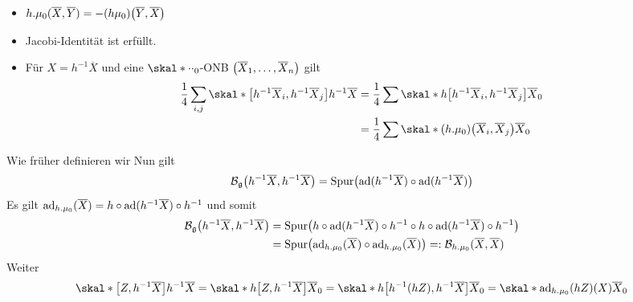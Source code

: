 \begin{itemize}
	\item $h . \mu_0 (\overline{X},\overline{Y}) = - (h \mu_0) \enbrace*{\overline{Y},\overline{X}}$
	\item Jacobi-Identität ist erfüllt.
	\item Für $X = h^{-1} \overline{X}$ und eine $\skal*{\cdot }{\cdot }_0$-ONB $\enbrace*{\overline{X}_1,\ldots ,\overline{X}_n}$ gilt 
	\begin{align}
		\frac{1}{4} \sum_{i,j} \skal*{\benbrace*{h^{-1} \overline{X}_i, h^{-1} \overline{X}_j}}{h^{-1} \overline{X}} &= \frac{1}{4} \sum \skal*{h \benbrace*{h^{-1} \overline{X}_i, h^{-1} \overline{X}_j}}{\overline{X}}_0 \\
		&= \frac{1}{4}\sum \skal*{(h.\mu_0) \enbrace*{\overline{X}_i, \overline{X}_j}}{\overline{X}}_0
	\end{align}
\end{itemize}
Wie früher definieren wir
Nun gilt
\[
	\mathcal{B}_\mathfrak{g} \enbrace*{h^{-1} \overline{X}, h^{-1} \overline{X}} = \Spur \enbrace*{\ad(h^{-1} \overline{X}) \circ \ad(h^{-1} \overline{X})}
\]
Es gilt $\ad_{h.\mu_0}(\overline{X}) = h \circ \ad(h^{-1} \overline{X}) \circ h^{-1}$ und somit
\begin{align}
	\mathcal{B}_\mathfrak{g} \enbrace*{h^{-1} \overline{X}, h^{-1} \overline{X}} &= \Spur \enbrace*{h \circ  \ad(h^{-1}\overline{X}) \circ h^{-1} \circ h \circ \ad(h^{-1} \overline{X}) \circ h^{-1}} \\
	&= \Spur \enbrace*{\ad_{h.\mu_0}(\overline{X}) \circ \ad_{h.\mu_0}(\overline{X})} =: \mathcal{B}_{h.\mu_0}(\overline{X},\overline{X})
\end{align}
Weiter
\begin{align}
	\skal*{\benbrace*{Z, h^{-1} \overline{X}}}{h^{-1} \overline{X}} = \skal*{h \benbrace*{Z,h^{-1} \overline{X}}}{\overline{X}}_0 = \skal*{h \benbrace*{h^{-1}(hZ), h^{-1} \overline{X}}}{\overline{X}}_0 = \skal*{\ad_{h.\mu_0}(hZ)(X)}{\overline{X}}_0
\end{align}

